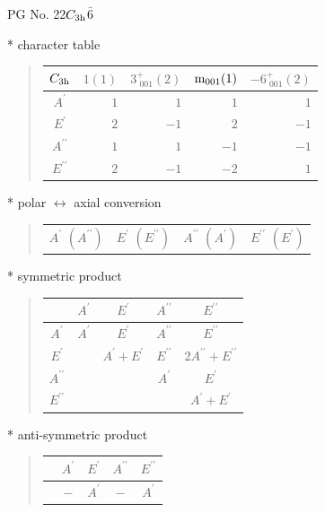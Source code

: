 \documentclass[fleqn,8pt,landscape]{jsarticle}
\begin{document}
\setcounter{MaxMatrixCols}{32}

\renewcommand{\tablename}{Table~}
\renewcommand{\figurename}{Figure~}
\begin{center}
\LARGE
PG No. 22\quad$C_{\rm 3h}$\quad$\bar{6}$\quad[ hexagonal ]
\end{center}

* character table
\begin{quote}
\begin{tabular}{crrrr} \hline \hline
$ C_{\rm 3h} $ & $ 1(1) $ & $ 3^{+}_{\,\,001}(2) $ & $ {\rm m}_{001}(1) $ & $ -6^{+}_{\,\,001}(2) $ \\ \hline
$ A^{\prime} $ & $ 1 $ & $ 1 $ & $ 1 $ & $ 1 $ \\
$ E^{\prime} $ & $ 2 $ & $ -1 $ & $ 2 $ & $ -1 $ \\
$ A^{\prime\prime} $ & $ 1 $ & $ 1 $ & $ -1 $ & $ -1 $ \\
$ E^{\prime\prime} $ & $ 2 $ & $ -1 $ & $ -2 $ & $ 1 $ \\
 \hline \hline
\end{tabular}
\end{quote}

* polar $\leftrightarrow$ axial conversion
\begin{quote}
\begin{tabular}{cccc}
$ A^{\prime}\,\,(A^{\prime\prime}) $ & $ E^{\prime}\,\,(E^{\prime\prime}) $ & $ A^{\prime\prime}\,\,(A^{\prime}) $ & $ E^{\prime\prime}\,\,(E^{\prime}) $
\end{tabular}
\end{quote}

* symmetric product
\begin{quote}
\begin{tabular}{c|cccc} \hline \hline
 & $ A^{\prime} $ & $ E^{\prime} $ & $ A^{\prime\prime} $ & $ E^{\prime\prime} $ \\ \hline
$ A^{\prime} $ & $ A^{\prime} $ & $ E^{\prime} $ & $ A^{\prime\prime} $ & $ E^{\prime\prime} $ \\
$ E^{\prime} $ & $  $ & $ A^{\prime} + E^{\prime} $ & $ E^{\prime\prime} $ & $ 2 A^{\prime\prime} + E^{\prime\prime} $ \\
$ A^{\prime\prime} $ & $  $ & $  $ & $ A^{\prime} $ & $ E^{\prime} $ \\
$ E^{\prime\prime} $ & $  $ & $  $ & $  $ & $ A^{\prime} + E^{\prime} $ \\
 \hline \hline
\end{tabular}
\end{quote}

* anti-symmetric product
\begin{quote}
\begin{tabular}{ccccc} \hline \hline
 & $ A^{\prime} $ & $ E^{\prime} $ & $ A^{\prime\prime} $ & $ E^{\prime\prime} $ \\ \hline
$  $ & $ - $ & $ A^{\prime} $ & $ - $ & $ A^{\prime} $ \\
 \hline \hline
\end{tabular}
\end{quote}
\end{document}

